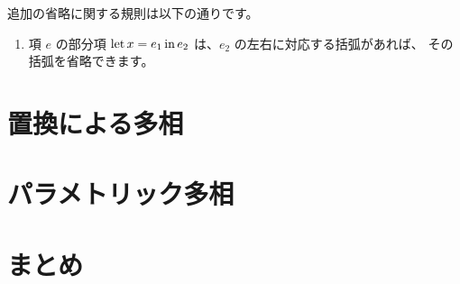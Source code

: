 追加の省略に関する規則は以下の通りです。

\begin{enumerate}
  \item 項 $e$ の部分項 $\mathrm{let} \, x = e_1 \, \mathrm{in} \, e_2$ は、$e_2$ の左右に対応する括弧があれば、
        その括弧を省略できます。
\end{enumerate}

\section{置換による多相}



\section{パラメトリック多相}



\section{まとめ}



